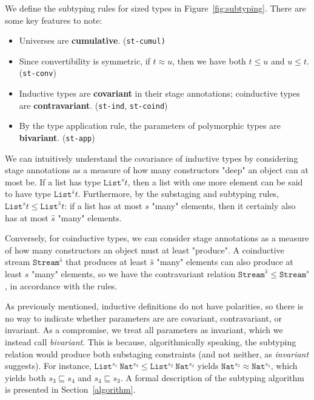 \documentclass[sigplan,10pt,anonymous,review,nonacm]{acmart}
\begin{document}
We define the subtyping rules for sized types in Figure~\ref{fig:subtyping}. There are some key features to note:

\begin{itemize}
    \item Universes are \textbf{cumulative}. (\texttt{st-cumul)}
    \item Since convertibility is symmetric, if $t \approx u$, then we have both $t \leq u$ and $u \leq t$. (\texttt{st-conv})
    \item Inductive types are \textbf{covariant} in their stage annotations; coinductive types are \textbf{contravariant}. (\texttt{st-ind}, \texttt{st-coind})
    \item By the type application rule, the parameters of polymorphic types are \textbf{bivariant}. (\texttt{st-app})
\end{itemize}

We can intuitively understand the covariance of inductive types by considering stage annotations as a measure of how many constructors "deep" an object can at most be. If a list has type $\texttt{List}^s t$, then a list with one more element can be said to have type $\texttt{List}^{\hat{s}} t$. Furthermore, by the substaging and subtyping rules, $\texttt{List}^s t \leq \texttt{List}^{\hat{s}} t$: if a list has at most $s$ "many" elements, then it certainly also has at most $\hat{s}$ "many" elements.

Conversely, for coinductive types, we can consider stage annotations as a measure of how many constructors an object must at least "produce". A coinductive stream $\texttt{Stream}^{\hat{s}}$ that produces at least $\hat{s}$ "many" elements can also produce at least $s$ "many" elements, so we have the contravariant relation $\texttt{Stream}^{\hat{s}} \leq \texttt{Stream}^s$, in accordance with the rules.

As previously mentioned, inductive definitions do not have polarities, so there is no way to indicate whether parameters are are covariant, contravariant, or invariant. As a compromise, we treat all parameters as invariant, which we instead call \textit{bivariant}. This is because, algorithmically speaking, the subtyping relation would produce both substaging constraints (and not neither, as \textit{invariant} suggests). For instance, $\texttt{List}^{s_1}\ \texttt{Nat}^{s_3} \leq \texttt{List}^{s_2}\ \texttt{Nat}^{s_4}$ yields $\texttt{Nat}^{s_3} \approx \texttt{Nat}^{s_4}$, which yields both $s_3 \sqsubseteq s_4$ and $s_4 \sqsubseteq s_3$. A formal description of the subtyping algorithm is presented in Section~\ref{algorithm}.
\end{document}

